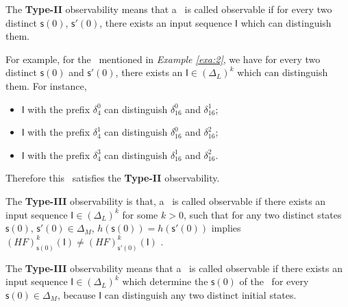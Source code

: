The {\bf Type-II} observability means that a \BCN\ is called observable if for every two distinct $\mathsf{s}(0)$, $\mathsf{s}'(0)$, there exists an input sequence $\mathsf{I}$ which can distinguish them. %
\begin{example}
For example, for the \BCN\ mentioned in {\em Example \ref{exa:2}}, we have for every two distinct $\mathsf{s}(0)$ and $\mathsf{s}'(0)$, there exists an $\mathsf{I}\in(\Delta_L)^k$ which can distinguish them.  For instance,
\begin{itemize}
  \item $\mathsf{I}$ with the prefix $\delta_{4}^0$ can distinguish $\delta_{16}^0$ and $\delta_{16}^1$;
  \item $\mathsf{I}$ with the prefix $\delta_{4}^1$ can distinguish $\delta_{16}^0$ and $\delta_{16}^2$;
  \item $\mathsf{I}$ with the prefix $\delta_{4}^3$ can distinguish $\delta_{16}^1$ and $\delta_{16}^2$.
\end{itemize} 
Therefore this \BCN\ satisfies the {\bf Type-II} observability.
\label{exa:5}
\end{example}   
\begin{definition}
The {\bf Type-III} observability is that, a \BCN\ is called observable if there exists an input sequence $\mathsf{I}\in(\Delta_L)^k$ for some $k>0$, such that for any two distinct states $\mathsf{s}(0)$, $\mathsf{s}'(0) \in \Delta_M$, $h(\mathsf{s}(0))=h(\mathsf{s}'(0))$ implies $(HF)^k_{\mathsf{s}(0)}(\mathsf{I})\neq (HF)^k_{\mathsf{s}'(0)}(\mathsf{I})$ \cite{Cheng2011Identification}.
\end{definition}

The {\bf Type-III} observability means that a \BCN\ is called observable if there exists an input sequence $\mathsf{I}\in(\Delta_L)^k$ which determine the $\mathsf{s}(0)$ of the \BCN\ for every $\mathsf{s}(0)\in\Delta_M$, because $\mathsf{I}$ can distinguish any two distinct initial states.%

